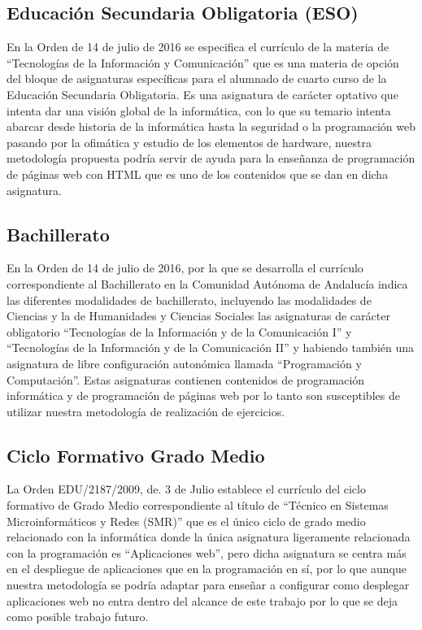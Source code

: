 \subsection {Educación Secundaria Obligatoria (ESO)}

En la Orden de 14 de julio de 2016 se especifica el currículo de la materia de ``Tecnologías de la Información y Comunicación'' que es una materia de opción del bloque de asignaturas específicas para el alumnado de cuarto curso de la Educación Secundaria Obligatoria. Es una asignatura de carácter optativo que intenta dar una visión global de la informática, con lo que su temario intenta abarcar desde historia de la informática hasta la seguridad o la programación web pasando por la ofimática y estudio de los elementos de hardware, nuestra metodología propuesta podría servir de ayuda para la enseñanza de programación de páginas web con HTML que es uno de los contenidos que se dan en dicha asignatura.

\subsection {Bachillerato}

En la Orden de 14 de julio de 2016, por la que se desarrolla el currículo correspondiente al Bachillerato en la Comunidad Autónoma de Andalucía indica las diferentes modalidades de bachillerato, incluyendo las modalidades de Ciencias y la de Humanidades y Ciencias Sociales las asignaturas de carácter obligatorio ``Tecnologías de la Información y de la Comunicación I'' y ``Tecnologías de la Información y de la Comunicación II'' y habiendo también una asignatura de libre configuración autonómica llamada ``Programación y Computación''. Estas asignaturas contienen contenidos de programación informática y de programación de páginas web por lo tanto son susceptibles de utilizar nuestra metodología de realización de ejercicios.

\subsection {Ciclo Formativo Grado Medio}

La Orden EDU/2187/2009, de. 3 de Julio establece el currículo del ciclo formativo de Grado Medio correspondiente al título de ``Técnico en Sistemas Microinformáticos y Redes (SMR)'' que es el único ciclo de grado medio relacionado con la informática donde la única asignatura ligeramente relacionada con la programación es ``Aplicaciones web'', pero dicha asignatura se centra más en el despliegue de aplicaciones que en la programación en sí, por lo que aunque nuestra metodología se podría adaptar para enseñar a configurar como desplegar aplicaciones web no entra dentro del alcance de este trabajo por lo que se deja como posible trabajo futuro.

